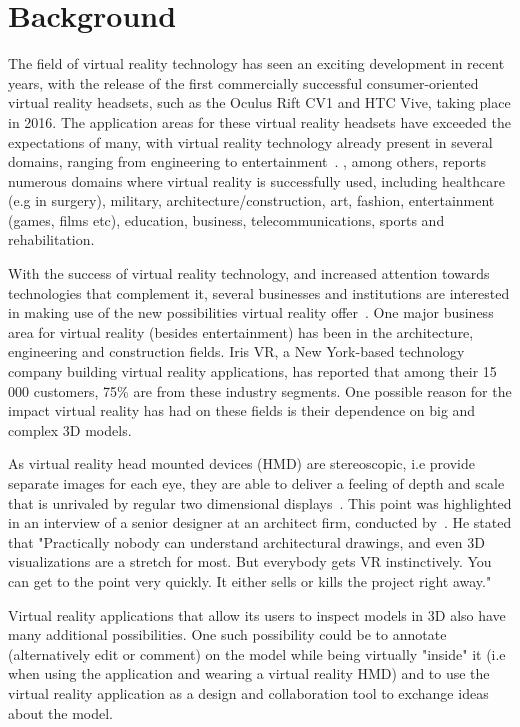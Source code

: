 \section{Background}           
The field of virtual reality technology has seen an exciting development in recent years, 
with the release of the first commercially successful consumer-oriented virtual reality headsets, such as the Oculus Rift CV1 and HTC Vive, taking place in 2016.
The application areas for these virtual reality headsets have exceeded the expectations of many, with virtual reality 
technology already present in several domains, ranging from engineering to entertainment~\citep{VRS2016}. 
\citet{VRS2016}, among others, reports numerous domains where virtual reality is successfully used, including 
healthcare (e.g in surgery), military, architecture/construction, art, fashion, entertainment (games, films etc), education, business, telecommunications, sports and rehabilitation.

With the success of virtual reality technology, and increased attention towards technologies that complement it, several businesses and institutions 
are interested in making use of the new possibilities virtual reality offer~\citep{TW22016}. One major business area for virtual reality (besides entertainment)
has been in the architecture, engineering and construction fields. Iris VR, a New York-based technology company building virtual reality applications, has reported that
among their 15 000 customers, 75\% are from these industry segments. One possible reason for the impact virtual reality has had on these fields is their dependence 
on big and complex 3D models. 

As virtual reality head mounted devices (HMD) are stereoscopic, i.e provide separate images for each eye, they are able to deliver a feeling of 
depth and scale that is unrivaled by regular two dimensional displays~\citep{POLYGON2016}. This point was highlighted in an interview of a senior designer at an architect 
firm, conducted by~\citet{TW22016}. He stated that "Practically nobody can understand architectural drawings, and even 3D visualizations are a stretch for most. 
But everybody gets VR instinctively. You can get to the point very quickly. It either sells or kills the project right away." 

Virtual reality applications that allow its users to inspect models in 3D also have many additional possibilities. 
One such possibility could be to annotate (alternatively edit or comment) on the model while being virtually "inside" it 
(i.e when using the application and wearing a virtual reality HMD) and 
to use the virtual reality application as a design and collaboration tool to exchange ideas about the model.

